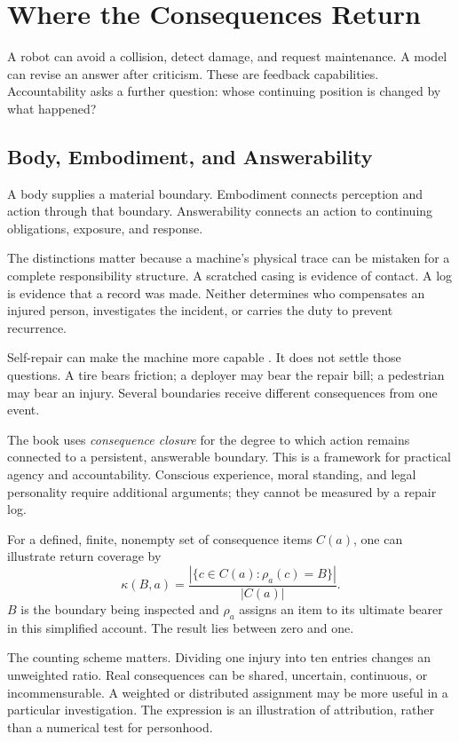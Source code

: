 \section{Where the Consequences Return}

A robot can avoid a collision, detect damage, and request maintenance. A model can revise an answer after criticism. These are feedback capabilities. Accountability asks a further question: whose continuing position is changed by what happened?

\subsection{Body, Embodiment, and Answerability}

A body supplies a material boundary. Embodiment connects perception and action through that boundary. Answerability connects an action to continuing obligations, exposure, and response.

The distinctions matter because a machine's physical trace can be mistaken for a complete responsibility structure. A scratched casing is evidence of contact. A log is evidence that a record was made. Neither determines who compensates an injured person, investigates the incident, or carries the duty to prevent recurrence.

Self-repair can make the machine more capable \cite{terryn2017self}. It does not settle those questions. A tire bears friction; a deployer may bear the repair bill; a pedestrian may bear an injury. Several boundaries receive different consequences from one event.

The book uses \emph{consequence closure} for the degree to which action remains connected to a persistent, answerable boundary. This is a framework for practical agency and accountability. Conscious experience, moral standing, and legal personality require additional arguments; they cannot be measured by a repair log.

For a defined, finite, nonempty set of consequence items $C(a)$, one can illustrate return coverage by
\begin{equation}
 \kappa(B,a)=
 \frac{\left|\{c\in C(a):\rho_a(c)=B\}\right|}
      {|C(a)|}.
\end{equation}
$B$ is the boundary being inspected and $\rho_a$ assigns an item to its ultimate bearer in this simplified account. The result lies between zero and one.

The counting scheme matters. Dividing one injury into ten entries changes an unweighted ratio. Real consequences can be shared, uncertain, continuous, or incommensurable. A weighted or distributed assignment may be more useful in a particular investigation. The expression is an illustration of attribution, rather than a numerical test for personhood.

